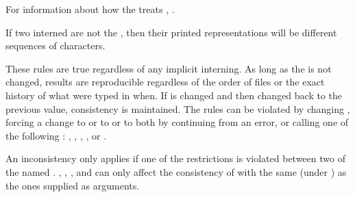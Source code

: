 For information about how the  treats ,
\seesection\PrintingSymbols.


If two interned  are not the ,
then their printed representations will be different sequences of characters.
\endlist

These rules are true regardless of any implicit interning.
As long as the  is not changed,
results are reproducible regardless of the order of  files 
or the exact history of what  were typed in when.  
If  is changed and then changed back to the previous value,
consistency is maintained.
The rules can be violated by
    changing ,
    forcing a change to  
                  or to  
    	          or to both
    by continuing from an error,
or calling one of the following :
    ,
    ,
    ,
    ,
 or .

An inconsistency only applies if one of the restrictions is violated
between two of the named .
, , ,
and  can only affect the consistency of
 with the same  (under )
as the ones supplied as arguments.

\endsubsection%
